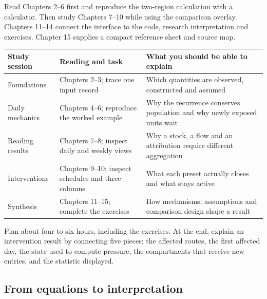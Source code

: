 \documentclass[11pt,a4paper]{article}
\begin{document}
Read Chapters 2--6 first and reproduce the two-region calculation with a
calculator. Then study Chapters 7--10 while using the comparison
overlay. Chapters 11--14 connect the interface to the code, research
interpretation and exercises. Chapter 15 supplies a compact reference
sheet and source map.

\begin{longtable}[]{@{}
  >{\raggedright\arraybackslash}p{}
  >{\raggedright\arraybackslash}p{}
  >{\raggedright\arraybackslash}p{}@{}}
\toprule\noalign{}
\begin{minipage}[b]{\linewidth}\raggedright
Study session
\end{minipage} & \begin{minipage}[b]{\linewidth}\raggedright
Reading and task
\end{minipage} & \begin{minipage}[b]{\linewidth}\raggedright
What you should be able to explain
\end{minipage} \\
\midrule\noalign{}
\endhead
\bottomrule\noalign{}
\endlastfoot
Foundations & Chapters 2--3; trace one input record & Which quantities
are observed, constructed and assumed \\
Daily mechanics & Chapters 4--6; reproduce the worked example & Why the
recurrence conserves population and why newly exposed units wait \\
Reading results & Chapters 7--8; inspect daily and weekly views & Why a
stock, a flow and an attribution require different aggregation \\
Interventions & Chapters 9--10; inspect schedules and three columns &
What each preset actually closes and what stays active \\
Synthesis & Chapters 11--15; complete the exercises & How mechanisms,
assumptions and comparison design shape a result \\
\end{longtable}

Plan about four to six hours, including the exercises. At the end,
explain an intervention result by connecting five pieces: the affected
routes, the first affected day, the state used to compute pressure, the
compartments that receive new entries, and the statistic displayed.

\subsection{From equations to
interpretation}\label{from-equations-to-interpretation}
\end{document}

